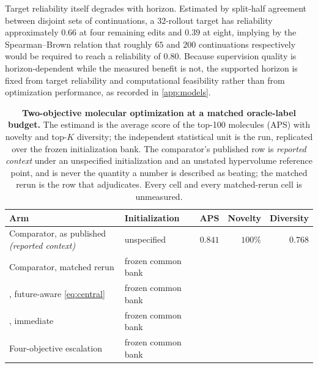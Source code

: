 Target reliability itself degrades with horizon. Estimated by split-half agreement between disjoint sets of continuations, a $32$-rollout target has reliability approximately $0.66$ at four remaining edits and $0.39$ at eight, implying by the Spearman--Brown relation that roughly $65$ and $200$ continuations respectively would be required to reach a reliability of $0.80$. Because supervision quality is horizon-dependent while the measured benefit is not, the supported horizon is fixed from target reliability and computational feasibility rather than from optimization performance, as recorded in \cref{app:models}.

\begin{table}[h]
\centering
\caption{\small\textbf{Two-objective molecular optimization at a matched oracle-label budget.} The estimand is the average score of the top-100 molecules (APS) with novelty and top-$K$ diversity; the independent statistical unit is the run, replicated over the frozen initialization bank. The comparator's published row is \emph{reported context} under an unspecified initialization and an unstated hypervolume reference point, and is never the quantity a \method{} number is described as beating; the matched rerun is the row that adjudicates. Every \method{} cell and every matched-rerun cell is unmeasured.}
\label{tab:multiobj}
\footnotesize
\begin{tabularx}{\textwidth}{@{}lY r r r@{}}
\toprule
Arm & Initialization & APS & Novelty & Diversity\\
\midrule
Comparator, as published \emph{(reported context)} & unspecified & $0.841$ & $100\%$ & $0.768$\\
Comparator, matched rerun & frozen common bank & \XXX{} & \XXX{} & \XXX{}\\
\method{}, future-aware \eqref{eq:central} & frozen common bank & \XXX{} & \XXX{} & \XXX{}\\
\method{}, immediate & frozen common bank & \XXX{} & \XXX{} & \XXX{}\\
Four-objective escalation & frozen common bank & \XXX{} & \XXX{} & \XXX{}\\
\bottomrule
\end{tabularx}
\end{table}


